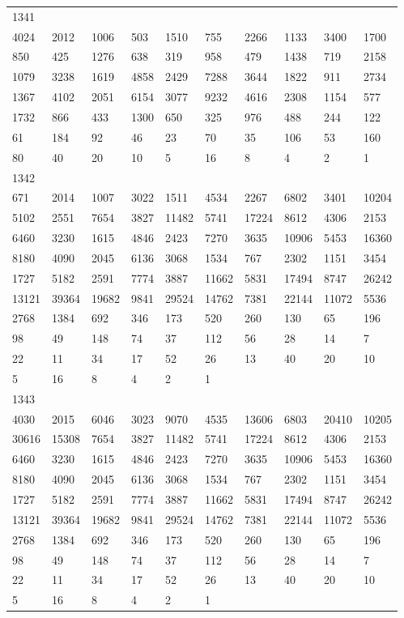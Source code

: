 \begin{longtable}{*{10}{l}}
1341&&&&&&&&&\\
4024& 2012& 1006& 503& 1510& 755& 2266& 1133& 3400& 1700\\
850& 425& 1276& 638& 319& 958& 479& 1438& 719& 2158\\
1079& 3238& 1619& 4858& 2429& 7288& 3644& 1822& 911& 2734\\
1367& 4102& 2051& 6154& 3077& 9232& 4616& 2308& 1154& 577\\
1732& 866& 433& 1300& 650& 325& 976& 488& 244& 122\\
61& 184& 92& 46& 23& 70& 35& 106& 53& 160\\
80& 40& 20& 10& 5& 16& 8& 4& 2& 1\\

1342&&&&&&&&&\\
671& 2014& 1007& 3022& 1511& 4534& 2267& 6802& 3401& 10204\\
5102& 2551& 7654& 3827& 11482& 5741& 17224& 8612& 4306& 2153\\
6460& 3230& 1615& 4846& 2423& 7270& 3635& 10906& 5453& 16360\\
8180& 4090& 2045& 6136& 3068& 1534& 767& 2302& 1151& 3454\\
1727& 5182& 2591& 7774& 3887& 11662& 5831& 17494& 8747& 26242\\
13121& 39364& 19682& 9841& 29524& 14762& 7381& 22144& 11072& 5536\\
2768& 1384& 692& 346& 173& 520& 260& 130& 65& 196\\
98& 49& 148& 74& 37& 112& 56& 28& 14& 7\\
22& 11& 34& 17& 52& 26& 13& 40& 20& 10\\
5& 16& 8& 4& 2& 1& \\

1343&&&&&&&&&\\
4030& 2015& 6046& 3023& 9070& 4535& 13606& 6803& 20410& 10205\\
30616& 15308& 7654& 3827& 11482& 5741& 17224& 8612& 4306& 2153\\
6460& 3230& 1615& 4846& 2423& 7270& 3635& 10906& 5453& 16360\\
8180& 4090& 2045& 6136& 3068& 1534& 767& 2302& 1151& 3454\\
1727& 5182& 2591& 7774& 3887& 11662& 5831& 17494& 8747& 26242\\
13121& 39364& 19682& 9841& 29524& 14762& 7381& 22144& 11072& 5536\\
2768& 1384& 692& 346& 173& 520& 260& 130& 65& 196\\
98& 49& 148& 74& 37& 112& 56& 28& 14& 7\\
22& 11& 34& 17& 52& 26& 13& 40& 20& 10\\
5& 16& 8& 4& 2& 1& \\


\end{longtable}
